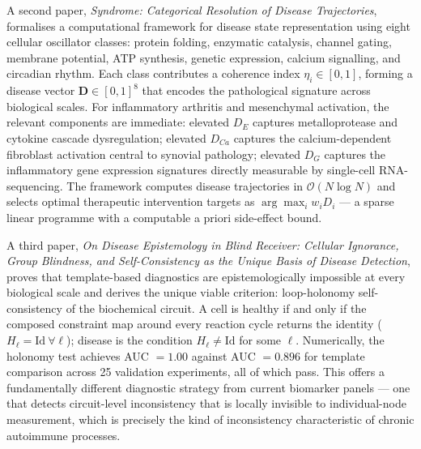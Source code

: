 \documentclass[12pt,a4paper]{article}
\begin{document}
A second paper, \textit{Syndrome: Categorical Resolution of Disease Trajectories},
formalises a computational framework for disease state representation using eight
cellular oscillator classes: protein folding, enzymatic catalysis, channel gating,
membrane potential, ATP synthesis, genetic expression, calcium signalling, and
circadian rhythm. Each class contributes a coherence index $\eta_i \in [0,1]$,
forming a disease vector $\mathbf{D} \in [0,1]^8$ that encodes the pathological
signature across biological scales. For inflammatory arthritis and mesenchymal
activation, the relevant components are immediate: elevated $D_E$ captures
metalloprotease and cytokine cascade dysregulation; elevated $D_{Ca}$ captures
the calcium-dependent fibroblast activation central to synovial pathology;
elevated $D_G$ captures the inflammatory gene expression signatures directly
measurable by single-cell RNA-sequencing. The framework computes disease
trajectories in $\mathcal{O}(N \log N)$ and selects optimal therapeutic
intervention targets as $\arg\max_i w_i D_i$ --- a sparse linear programme
with a computable a priori side-effect bound.

A third paper, \textit{On Disease Epistemology in Blind Receiver: Cellular
Ignorance, Group Blindness, and Self-Consistency as the Unique Basis of Disease
Detection}, proves that template-based diagnostics are epistemologically
impossible at every biological scale and derives the unique viable criterion:
loop-holonomy self-consistency of the biochemical circuit. A cell is healthy if
and only if the composed constraint map around every reaction cycle returns the
identity ($H_\ell = \mathrm{Id}\ \forall\ell$); disease is the condition
$H_\ell \neq \mathrm{Id}$ for some $\ell$. Numerically, the holonomy test
achieves AUC $= 1.00$ against AUC $= 0.896$ for template comparison across
25 validation experiments, all of which pass. This offers a fundamentally
different diagnostic strategy from current biomarker panels --- one that detects
circuit-level inconsistency that is locally invisible to individual-node
measurement, which is precisely the kind of inconsistency characteristic of
chronic autoimmune processes.
\end{document}
